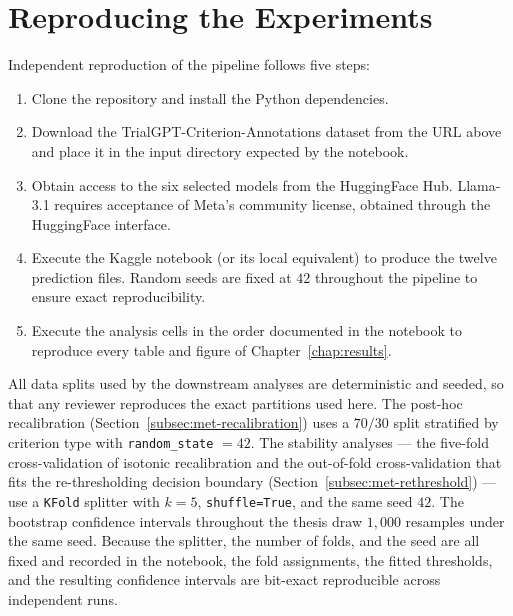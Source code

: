 \section{Reproducing the Experiments}
\label{sec:app-reproduce}

Independent reproduction of the pipeline follows five steps:

\begin{enumerate}
    \item Clone the repository and install the Python dependencies.
    \item Download the TrialGPT-Criterion-Annotations dataset from 
    the URL above and place it in the input directory expected by 
    the notebook.
    \item Obtain access to the six selected models from the 
    HuggingFace Hub. Llama-3.1 requires acceptance of Meta's 
    community license, obtained through the HuggingFace interface.
    \item Execute the Kaggle notebook (or its local equivalent) to 
    produce the twelve prediction files. Random seeds are fixed at 
    $42$ throughout the pipeline to ensure exact reproducibility.
    \item Execute the analysis cells in the order documented in the 
    notebook to reproduce every table and figure of 
    Chapter~\ref{chap:results}.
\end{enumerate}

All data splits used by the downstream analyses are deterministic and 
seeded, so that any reviewer reproduces the exact partitions used here. 
The post-hoc recalibration (Section~\ref{subsec:met-recalibration}) uses 
a $70/30$ split stratified by criterion type with \texttt{random\_state} 
$=42$. The stability analyses --- the five-fold cross-validation of 
isotonic recalibration and the out-of-fold cross-validation that fits 
the re-thresholding decision boundary 
(Section~\ref{subsec:met-rethreshold}) --- use a 
\texttt{KFold} splitter with $k=5$, \texttt{shuffle=True}, and the same 
seed $42$. The bootstrap confidence intervals throughout the thesis draw 
$1{,}000$ resamples under the same seed. Because the splitter, the 
number of folds, and the seed are all fixed and recorded in the 
notebook, the fold assignments, the fitted thresholds, and the resulting 
confidence intervals are bit-exact reproducible across independent runs.

